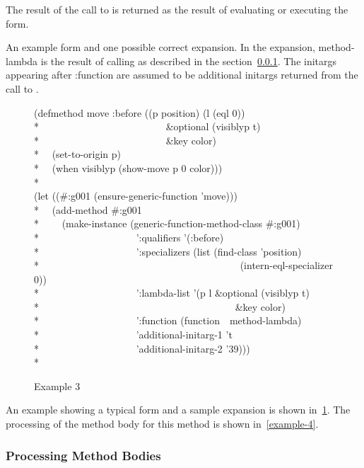 The result of the call to  is returned as the result of evaluating or
executing the  form. 

An example  form and one possible correct expansion.
In the expansion, method-lambda is the result of calling  as
described in the section~\ref{PROCESSING-METHOD-BODIES}. The initargs appearing
after :function are assumed to be additional initargs returned from the call to
. 

\begin{figure}
\caption{Example 3}
\label{example-3}
\begin{lisp}
(defmethod move :before ((p position) (l (eql 0))\\*
~~~~~~~~~~~~~~~~~~~~~~~~~\&optional (visiblyp t)\\*
~~~~~~~~~~~~~~~~~~~~~~~~~\&key color)\\*
~~(set-to-origin p)\\*
~~(when visiblyp (show-move p 0 color)))\\*
\\
(let ((\#:g001 (ensure-generic-function 'move)))\\*
~~(add-method \#:g001\\*
~~~~(make-instance (generic-function-method-class \#:g001)\\*
~~~~~~~~~~~~~~~~~~~':qualifiers '(:before)\\*
~~~~~~~~~~~~~~~~~~~':specializers (list (find-class 'position)\\*
~~~~~~~~~~~~~~~~~~~~~~~~~~~~~~~~~~~~~~~~(intern-eql-specializer 0))\\*
~~~~~~~~~~~~~~~~~~~':lambda-list '(p l \&optional (visiblyp t)\\*
~~~~~~~~~~~~~~~~~~~~~~~~~~~~~~~~~~~~~~~\&key color)\\*
~~~~~~~~~~~~~~~~~~~':function (function~~method-lambda)\\*
~~~~~~~~~~~~~~~~~~~'additional-initarg-1 't\\*
~~~~~~~~~~~~~~~~~~~'additional-initarg-2 '39)))\\*
\end{lisp}
\end{figure}

An example showing a typical  form and a sample expansion is
shown in~\ref{example-3}. The processing of the method body for this method is shown in~\ref{example-4}.

\subsubsection{Processing Method Bodies}
\label{PROCESSING-METHOD-BODIES}

